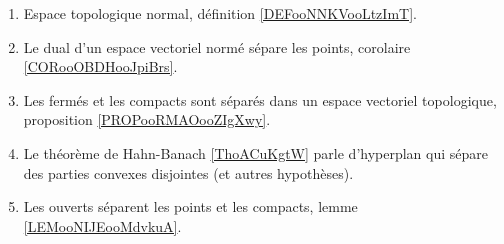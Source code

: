 	\label{THEMEooSeparabilite}
\begin{enumerate}
	\item
	      Espace topologique normal, définition \ref{DEFooNNKVooLtzImT}.
	\item
	      Le dual d'un espace vectoriel normé sépare les points, corolaire \ref{CORooOBDHooJpiBrs}.
	\item
	      Les fermés et les compacts sont séparés dans un espace vectoriel topologique, proposition \ref{PROPooRMAOooZIgXwy}.
	\item
	      Le théorème de Hahn-Banach \ref{ThoACuKgtW} parle d'hyperplan qui sépare des parties convexes disjointes (et autres hypothèses).
	\item
	      Les ouverts séparent les points et les compacts, lemme \ref{LEMooNIJEooMdvkuA}.
\end{enumerate}

